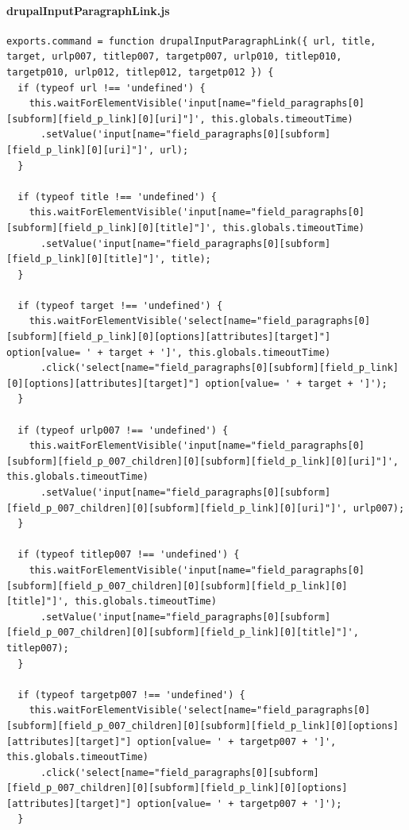 \paragraph{drupalInputParagraphLink.js}
\begin{lstlisting}[breaklines=true]
exports.command = function drupalInputParagraphLink({ url, title, target, urlp007, titlep007, targetp007, urlp010, titlep010, targetp010, urlp012, titlep012, targetp012 }) {
  if (typeof url !== 'undefined') {
    this.waitForElementVisible('input[name="field_paragraphs[0][subform][field_p_link][0][uri]"]', this.globals.timeoutTime)
      .setValue('input[name="field_paragraphs[0][subform][field_p_link][0][uri]"]', url);
  }

  if (typeof title !== 'undefined') {
    this.waitForElementVisible('input[name="field_paragraphs[0][subform][field_p_link][0][title]"]', this.globals.timeoutTime)
      .setValue('input[name="field_paragraphs[0][subform][field_p_link][0][title]"]', title);
  }

  if (typeof target !== 'undefined') {
    this.waitForElementVisible('select[name="field_paragraphs[0][subform][field_p_link][0][options][attributes][target]"] option[value= ' + target + ']', this.globals.timeoutTime)
      .click('select[name="field_paragraphs[0][subform][field_p_link][0][options][attributes][target]"] option[value= ' + target + ']');
  }

  if (typeof urlp007 !== 'undefined') {
    this.waitForElementVisible('input[name="field_paragraphs[0][subform][field_p_007_children][0][subform][field_p_link][0][uri]"]', this.globals.timeoutTime)
      .setValue('input[name="field_paragraphs[0][subform][field_p_007_children][0][subform][field_p_link][0][uri]"]', urlp007);
  }

  if (typeof titlep007 !== 'undefined') {
    this.waitForElementVisible('input[name="field_paragraphs[0][subform][field_p_007_children][0][subform][field_p_link][0][title]"]', this.globals.timeoutTime)
      .setValue('input[name="field_paragraphs[0][subform][field_p_007_children][0][subform][field_p_link][0][title]"]', titlep007);
  }

  if (typeof targetp007 !== 'undefined') {
    this.waitForElementVisible('select[name="field_paragraphs[0][subform][field_p_007_children][0][subform][field_p_link][0][options][attributes][target]"] option[value= ' + targetp007 + ']', this.globals.timeoutTime)
      .click('select[name="field_paragraphs[0][subform][field_p_007_children][0][subform][field_p_link][0][options][attributes][target]"] option[value= ' + targetp007 + ']');
  }


\end{lstlisting}
